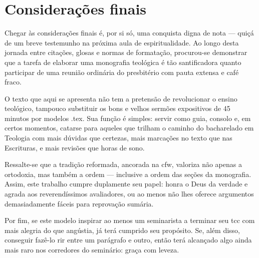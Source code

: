 \newpage
\newcommand{\tituloConsideracoesFinais}{Considerações finais}

\chapter*{\tituloConsideracoesFinais}
\addcontentsline{toc}{section}{\MakeUppercase{\tituloConsideracoesFinais}}

Chegar às considerações finais é, por si só, uma conquista digna de nota — quiçá de um breve testemunho na próxima aula de espiritualidade. Ao longo desta jornada entre citações, glosas e normas de formatação, procurou-se demonstrar que a tarefa de elaborar uma monografia teológica é tão santificadora quanto participar de uma reunião ordinária do presbitério com pauta extensa e café fraco.

O texto que aqui se apresenta não tem a pretensão de revolucionar o ensino teológico, tampouco substituir os bons e velhos sermões expositivos de 45 minutos por modelos .tex. Sua função é simples: servir como guia, consolo e, em certos momentos, catarse para aqueles que trilham o caminho do bacharelado em Teologia com mais dúvidas que certezas, mais marcações no texto que nas Escrituras, e mais revisões que horas de sono.

Ressalte-se que a tradição reformada, ancorada na \gls{cfw}, valoriza não apenas a ortodoxia, mas também a ordem — inclusive a ordem das seções da monografia. Assim, este trabalho cumpre duplamente seu papel: honra o Deus da verdade e agrada aos reverendíssimos avaliadores, ou ao menos não lhes oferece argumentos demasiadamente fáceis para reprovação sumária.

Por fim, se este modelo inspirar ao menos um seminarista a terminar seu \gls{tcc} com mais alegria do que angústia, já terá cumprido seu propósito. Se, além disso, conseguir fazê-lo rir entre um parágrafo e outro, então terá alcançado algo ainda mais raro nos corredores do seminário: graça com leveza.
